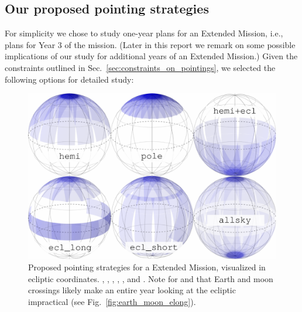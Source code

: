 \subsection{Our proposed pointing strategies}
\label{sec:proposed_pointings}

For simplicity we chose to study one-year plans for an Extended
Mission, i.e., plans for Year 3 of the \tess mission. (Later in this
report we remark on some possible implications of our study for
additional years of an Extended Mission.)  Given the constraints
outlined in Sec.~\ref{sec:constraints_on_pointings}, we selected the
following options for detailed study:

\begin{figure}[!bt]
	\includegraphics{figures/proposed_pointings_fin_names.pdf}
	\caption{Proposed pointing strategies for a \tess Extended Mission, visualized in ecliptic coordinates. \nhemi, \npole, \shemiAvoid, \elong, \eshort, and \hemis. Note for \elong\:and \eshort\:that Earth and moon crossings likely make an entire year looking at the ecliptic impractical (see Fig.~\protect\ref{fig:earth_moon_elong}).}
	\label{fig:proposed_pointings}
\end{figure}

